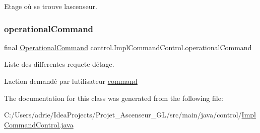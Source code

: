 Etage où se trouve l\textquotesingle{}ascenseur. 

\mbox{\label{classcontrol_1_1_impl_command_control_adbe2ee9057a11e4d2408947f5ff83cd5}} 
\subsubsection{\texorpdfstring{operationalCommand}{operationalCommand}}
{\footnotesize\ttfamily final \mbox{\hyperlink{interfacecontrol_1_1_operational_command}{Operational\+Command}} control.\+Impl\+Command\+Control.\+operational\+Command\hspace{0.3cm}{\ttfamily [private]}}



Liste des differentes requete d\textquotesingle{}étage. 

L\textquotesingle{}action demandé par l\textquotesingle{}utilisateur \mbox{\hyperlink{namespacecontrol_1_1command}{command}} 

The documentation for this class was generated from the following file\+:\begin{DoxyCompactItemize}
\item 
C\+:/\+Users/adrie/\+Idea\+Projects/\+Projet\+\_\+\+Ascenseur\+\_\+\+G\+L/src/main/java/control/\mbox{\hyperlink{_impl_command_control_8java}{Impl\+Command\+Control.\+java}}\end{DoxyCompactItemize}
